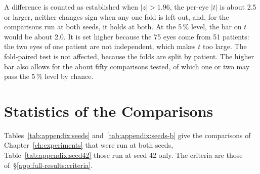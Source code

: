 A difference is counted as established when $|z| > 1.96$, the per-eye $|t|$
is about 2.5 or larger, neither changes sign when any one fold is left out,
and, for the comparisons run at both seeds, it holds at both. At the
5\,\% level, the bar on $t$ would be about 2.0. It is set higher because
the 75 eyes come from 51 patients: the two eyes of one patient are not
independent, which makes $t$ too large. The fold-paired test is not
affected, because the folds are split by patient. The higher bar also
allows for the about fifty comparisons tested, of which one or two may
pass the 5\,\% level by chance.

\section{Statistics of the Comparisons}
\label{app:full-results:seeds}

Tables~\ref{tab:appendix:seeds} and~\ref{tab:appendix:seeds-b} give the
comparisons of Chapter~\ref{ch:experiments} that were run at both seeds,
Table~\ref{tab:appendix:seed42} those run at seed 42 only. The criteria
are those of~\S\ref{app:full-results:criteria}.

